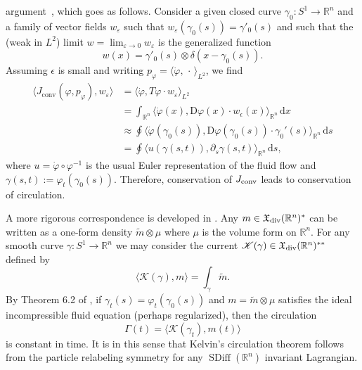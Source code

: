 \documentclass[12pt]{amsart}
\newcommand{\R}{\ensuremath{\mathbb{R}}}
\DeclareMathOperator{\SDiff}{SDiff}
\begin{document}
argument~\cite[Ch~1, Thm~5.5]{ArnoldKhesin1998}, which goes as follows. 
Consider a given closed curve $\gamma_0\colon S^1 \to \R^n$ and a family
of vector fields $w_\varepsilon$ such that $w_\varepsilon(\gamma_0(s)) = \gamma'_0(s)$
and such that the (weak in $L^2$) limit $w = \lim_{\varepsilon \to 0} w_\varepsilon$ is the generalized function
\begin{equation*}
  w(x) =  \gamma'_0(s) \otimes \delta(x-\gamma_0(s)).
\end{equation*}
Assuming $\epsilon$ is small and writing 
$p_\varphi = \langle \dot{\varphi} , \,\cdot\, \rangle_{L^2}$, we find
\begin{align*}
  \langle J_\text{conv}(\varphi,p_\varphi) , w_\varepsilon \rangle
  &= \langle \dot{\varphi} , T\varphi \cdot w_\varepsilon \rangle_{L^2}\\
  &= \int_{\mathbb{R}^n} \langle \dot{\varphi}(x) , \textrm{D}\varphi(x)\cdot w_\epsilon(x) \rangle_{\mathbb{R}^n} \,\textrm{d} x \\
  &\approx \oint \langle \dot{\varphi}(\gamma_0(s)) , \textrm{D}\varphi(\gamma_0(s))\cdot \gamma_0'(s) \rangle_{\mathbb{R}^n} \,\textrm{d} s \\
  &= \oint \langle u(\gamma(s,t)) , \partial_s \gamma(s,t) \rangle_{\mathbb{R}^n} \,\textrm{d} s,
\end{align*}
where $u = \dot{\varphi}\circ\varphi^{-1}$ is the usual Euler
representation of the fluid flow and $\gamma(s,t) := \varphi_t(\gamma_0(s))$. 
Therefore, conservation of $J_{\rm conv}$ leads to conservation of circulation.

A more rigorous correspondence is developed in \cite{HolmMarsdenRatiu1998}.
Any $m \in \mathfrak{X}_{\rm div}(\R^n)^*$ can be written as a one-form density $\tilde{m} \otimes \mu$
where $\mu$ is the volume form on $\R^n$.
For any smooth curve $\gamma:S^1 \to \R^n$ we may consider the current
$\mathscr{K}(\gamma) \in \mathfrak{X}_{\rm div}(\R^n)^{**}$ defined by
\begin{equation*}
	\langle \mathscr{K}(\gamma) , m \rangle = \int_{\gamma} \tilde{m}.
\end{equation*}
By Theorem 6.2 of \cite{HolmMarsdenRatiu1998}, if $\gamma_t(s) = \varphi_t(\gamma_0(s))$ and $m = \tilde{m} \otimes \mu$ satisfies
the ideal incompressible fluid equation (perhaps regularized), then the circulation
\begin{equation*}
	\Gamma(t) = \langle \mathscr{K}(\gamma_t) , m(t) \rangle
\end{equation*}
is constant in time.
It is in this sense that Kelvin's circulation theorem follows from the particle
relabeling symmetry for any $\SDiff(\R^n)$ invariant Lagrangian. 
\end{document}
